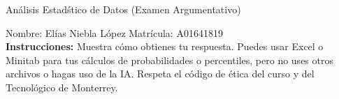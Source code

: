 \documentclass[8pt]{report}
\begin{document}
\begin{center}
{An\'alisis Estad\'stico de Datos (Examen Argumentativo)}
\end{center}

Nombre: \underline{\hspace*{.2in}}
Elías Niebla López
\underline{\hspace*{.2in}} \quad Matr\'icula:\underline{\hspace*{.2in}}
A01641819
\underline{\hspace*{.2in}} \\

{\bf Instrucciones:} Muestra c\'omo obtienes tu respuesta. Puedes usar Excel 
o Minitab para tus cálculos de probabilidades o 
percentiles, pero no uses otros archivos o hagas uso de la IA. Respeta el 
c\'odigo de \'etica del curso y del Tecnol\'ogico 
de Monterrey.
\end{document}
